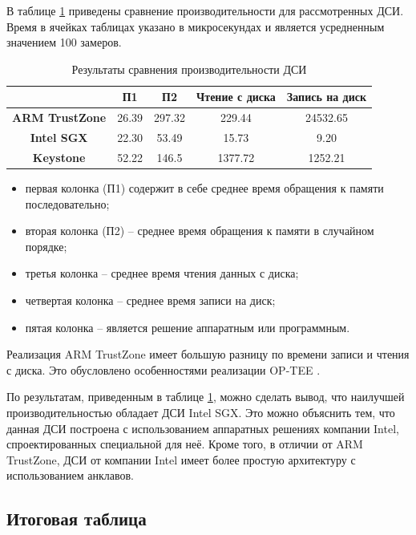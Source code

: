 В таблице \ref{table:perf} приведены сравнение производительности для рассмотренных ДСИ. Время в ячейках таблицах указано в микросекундах и является усредненным значением 100 замеров.

\begin{table}[!htb]
	\begin{center}
		\caption{Результаты сравнения производительности ДСИ}
		\label{table:perf}
		\begin{tabular}{|c|c|c|c|c|}
			\hline
			& \bfseries П1 & \bfseries П2  & \bfseries Чтение с диска & \bfseries Запись на диск\\
			\hline
			\bfseries ARM TrustZone & 26.39 & 297.32 & 229.44 & 24532.65 \\ \hline
			\bfseries Intel SGX & 22.30 & 53.49 & 15.73 & 9.20 \\ \hline
			\bfseries Keystone & 52.22 & 146.5 & 1377.72 & 1252.21 \\ \hline	
		\end{tabular}
	\end{center}
\end{table}

\begin{itemize}
	\item первая колонка (П1) содержит в себе среднее время обращения к памяти последовательно;
	\item вторая колонка (П2) -- среднее время обращения к памяти в случайном порядке;
	\item третья колонка -- среднее время чтения данных с диска;
	\item четвертая колонка -- среднее время записи на диск;
	\item пятая колонка -- является решение аппаратным или программным.
\end{itemize}

Реализация ARM TrustZone имеет большую разницу по времени записи и чтения с диска. Это обусловлено особенностями реализации OP-TEE \cite{comparsion-perf}.

По результатам, приведенным в таблице \ref{table:perf}, можно сделать вывод, что наилучшей производительностью обладает ДСИ Intel SGX. Это можно объяснить тем, что данная ДСИ построена с использованием аппаратных решениях компании Intel, спроектированных специальной для неё. Кроме того, в отличии от ARM TrustZone, ДСИ от компании Intel имеет более простую архитектуру с использованием анклавов.

\subsection{Итоговая таблица}

